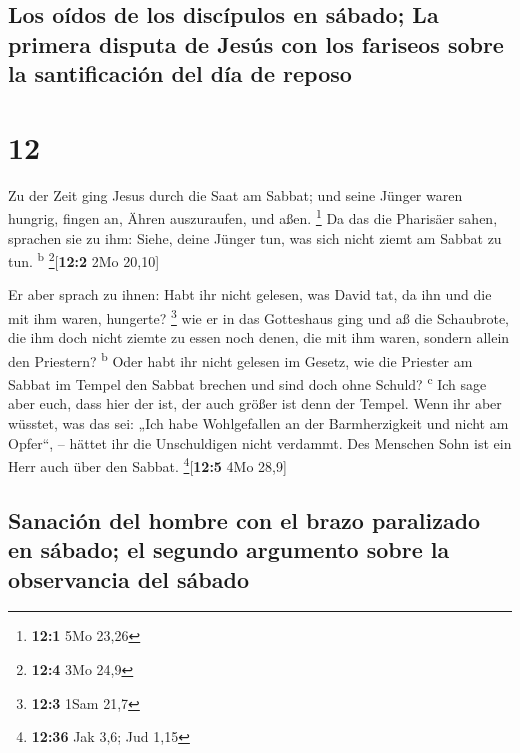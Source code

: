 \hypertarget{los-ouxeddos-de-los-discuxedpulos-en-suxe1bado-la-primera-disputa-de-jesuxfas-con-los-fariseos-sobre-la-santificaciuxf3n-del-duxeda-de-reposo}{%
\subsection{Los oídos de los discípulos en sábado; La primera disputa de
Jesús con los fariseos sobre la santificación del día de
reposo}\label{los-ouxeddos-de-los-discuxedpulos-en-suxe1bado-la-primera-disputa-de-jesuxfas-con-los-fariseos-sobre-la-santificaciuxf3n-del-duxeda-de-reposo}}

\hypertarget{section-11}{%
\section{12}\label{section-11}}

 Zu der Zeit ging Jesus durch die Saat am Sabbat; und
seine Jünger waren hungrig, fingen an, Ähren auszuraufen, und aßen.
\footnote{\textbf{12:1} 5Mo 23,26}  Da das die Pharisäer
sahen, sprachen sie zu ihm: Siehe, deine Jünger tun, was sich nicht
ziemt am Sabbat zu tun. \textsuperscript{b} \footnote{\textbf{12:4} 3Mo
  24,9}{[}\textbf{12:2} 2Mo 20,10{]}

 Er aber sprach zu ihnen: Habt ihr nicht gelesen, was
David tat, da ihn und die mit ihm waren, hungerte? \footnote{\textbf{12:3}
  1Sam 21,7}  wie er in das Gotteshaus ging und aß die
Schaubrote, die ihm doch nicht ziemte zu essen noch denen, die mit ihm
waren, sondern allein den Priestern? \textsuperscript{b} 
Oder habt ihr nicht gelesen im Gesetz, wie die Priester am Sabbat im
Tempel den Sabbat brechen und sind doch ohne Schuld? \textsuperscript{c}
 Ich sage aber euch, dass hier der ist, der auch größer
ist denn der Tempel.  Wenn ihr aber wüsstet, was das sei:
„Ich habe Wohlgefallen an der Barmherzigkeit und nicht am Opfer``, --
hättet ihr die Unschuldigen nicht verdammt.  Des Menschen
Sohn ist ein Herr auch über den Sabbat. \footnote{\textbf{12:36} Jak
  3,6; Jud 1,15}{[}\textbf{12:5} 4Mo 28,9{]}

\hypertarget{sanaciuxf3n-del-hombre-con-el-brazo-paralizado-en-suxe1bado-el-segundo-argumento-sobre-la-observancia-del-suxe1bado}{%
\subsection{Sanación del hombre con el brazo paralizado en sábado; el
segundo argumento sobre la observancia del
sábado}\label{sanaciuxf3n-del-hombre-con-el-brazo-paralizado-en-suxe1bado-el-segundo-argumento-sobre-la-observancia-del-suxe1bado}}

